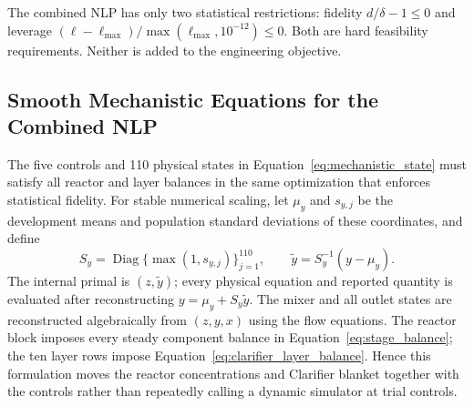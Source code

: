 \documentclass[a4paper,fleqn]{cas-sc}
\begin{document}
The combined NLP has only two statistical restrictions: fidelity $d/\delta-1\leq0$ and leverage $(\ell-\ell_{\max})/\max(\ell_{\max},10^{-12})\leq0$. Both are hard feasibility requirements. Neither is added to the engineering objective.

\subsection{Smooth Mechanistic Equations for the Combined NLP}

The five controls and 110 physical states in Equation~\eqref{eq:mechanistic_state} must satisfy all reactor and layer balances in the same optimization that enforces statistical fidelity. For stable numerical scaling, let $\mu_y$ and $s_{y,j}$ be the development means and population standard deviations of these coordinates, and define
\begin{equation}
S_y=\operatorname{Diag}\{\max(1,s_{y,j})\}_{j=1}^{110},
\qquad \widetilde y=S_y^{-1}(y-\mu_y).
\end{equation}
The internal primal is $(z,\widetilde y)$; every physical equation and reported quantity is evaluated after reconstructing $y=\mu_y+S_y\widetilde y$.
The mixer and all outlet states are reconstructed algebraically from $(z,y,x)$ using the flow equations. The reactor block imposes every steady component balance in Equation~\eqref{eq:stage_balance}; the ten layer rows impose Equation~\eqref{eq:clarifier_layer_balance}. Hence this formulation moves the reactor concentrations and Clarifier blanket together with the controls rather than repeatedly calling a dynamic simulator at trial controls.
\end{document}
